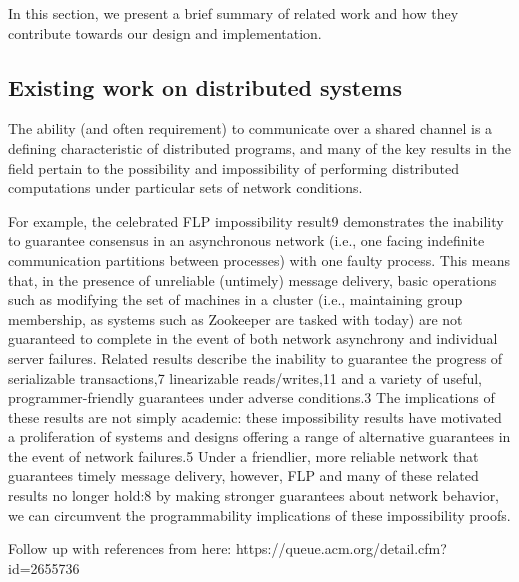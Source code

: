 In this section, we present a brief summary of related work and how they contribute towards
our design and implementation.


\subsection{Existing work on distributed systems}

The ability (and often requirement) to communicate over a shared channel is a defining characteristic of distributed
programs, and many of the key results in the field pertain to the possibility and impossibility of performing
distributed computations under particular sets of network conditions.

For example, the celebrated FLP impossibility result9 demonstrates the inability to guarantee consensus in an
asynchronous network (i.e., one facing indefinite communication partitions between processes) with one faulty process.
This means that, in the presence of unreliable (untimely) message delivery, basic operations such as modifying the set
of machines in a cluster (i.e., maintaining group membership, as systems such as Zookeeper are tasked with today) are
not guaranteed to complete in the event of both network asynchrony and individual server failures. Related results
describe the inability to guarantee the progress of serializable transactions,7 linearizable reads/writes,11 and a
variety of useful, programmer-friendly guarantees under adverse conditions.3 The implications of these results are not
simply academic: these impossibility results have motivated a proliferation of systems and designs offering a range of
alternative guarantees in the event of network failures.5 Under a friendlier, more reliable network that guarantees
timely message delivery, however, FLP and many of these related results no longer hold:8 by making stronger guarantees
about network behavior, we can circumvent the programmability implications of these impossibility proofs.

Follow up with references from here: https://queue.acm.org/detail.cfm?id=2655736
